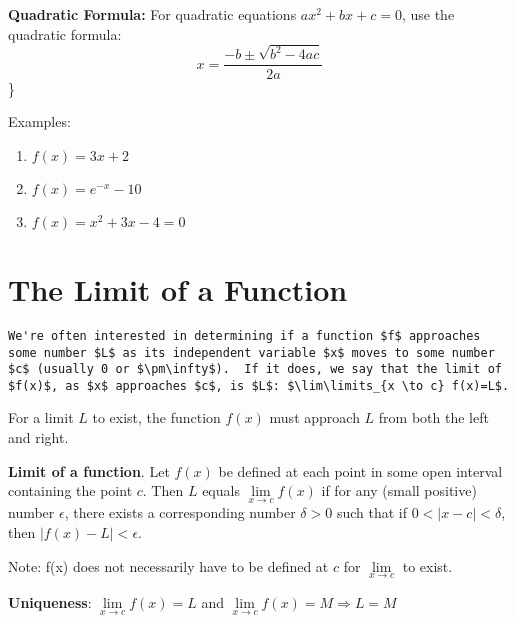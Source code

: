 \documentclass[]{book}
\theoremstyle{definition}
\theoremstyle{definition}
\theoremstyle{definition}
\theoremstyle{remark}
\begin{document}
\textbf{Quadratic Formula:} For quadratic equations \(ax^2+bx+c=0\), use
the quadratic formula: \[x=\frac{-b\pm\sqrt{b^2-4ac}}{2a}\]\}

Examples:

\begin{enumerate}
        \item $f(x)=3x+2$ \\
        \item $f(x)=e^{-x}-10$ \\
        \item $f(x)=x^2+3x-4=0$  \\
\end{enumerate}

\section{The Limit of a Function}\label{the-limit-of-a-function}

\begin{verbatim}
We're often interested in determining if a function $f$ approaches some number $L$ as its independent variable $x$ moves to some number $c$ (usually 0 or $\pm\infty$).  If it does, we say that the limit of $f(x)$, as $x$ approaches $c$, is $L$: $\lim\limits_{x \to c} f(x)=L$.
\end{verbatim}

For a limit \(L\) to exist, the function \(f(x)\) must approach \(L\)
from both the left and right.

\textbf{Limit of a function}. Let \(f(x)\) be defined at each point in
some open interval containing the point \(c\). Then \(L\) equals
\(\lim\limits_{x \to c} f(x)\) if for any (small positive) number
\(\epsilon\), there exists a corresponding number \(\delta>0\) such that
if \(0<|x-c|<\delta\), then \(|f(x)-L|<\epsilon\).

Note: f(x) does not necessarily have to be defined at \(c\) for
\(\lim\limits_{x \to c}\) to exist.

\textbf{Uniqueness}: \(\lim\limits_{x \to c} f(x)=L\) and
\(\lim\limits_{x \to c} f(x)=M \Longrightarrow L=M\)
\end{document}
